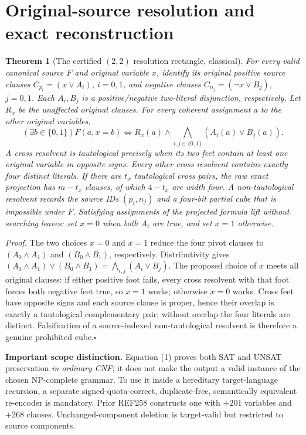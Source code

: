 \documentclass[10pt]{article}
\newtheorem{theorem}{Theorem}
\begin{document}
\section{Original-source resolution and exact reconstruction}
\begin{theorem}[The certified $(2,2)$ resolution rectangle, classical]
For every valid canonical source $F$ and original variable $x$, identify its original positive source clauses $C_{p_i}=(x\vee A_i)$, $i=0,1$, and negative clauses $C_{n_j}=(\neg x\vee B_j)$, $j=0,1$. Each $A_i,B_j$ is a positive/negative two-literal disjunction, respectively. Let $R_x$ be the unaffected original clauses. For every coherent assignment $a$ to the other original variables,
\[
 (\exists b\in\{0,1\})F(a,x=b)
 \iff R_x(a)\land\bigwedge_{i,j\in\{0,1\}}(A_i(a)\vee B_j(a)).\tag{1}
\]
A cross resolvent is tautological precisely when its two feet contain at least one original variable in opposite signs. Every other cross resolvent contains exactly four distinct literals. If there are $t_x$ tautological cross pairs, the raw exact projection has $m-t_x$ clauses, of which $4-t_x$ are width four. A non-tautological resolvent records the source IDs $(p_i,n_j)$ and a four-bit partial cube that is impossible under $F$. Satisfying assignments of the projected formula lift without searching leaves: set $x=0$ when both $A_i$ are true, and set $x=1$ otherwise.
\end{theorem}
\noindent\textit{Proof.} The two choices $x=0$ and $x=1$ reduce the four pivot clauses to $(A_0\land A_1)$ and $(B_0\land B_1)$, respectively. Distributivity gives \((A_0\land A_1)\lor(B_0\land B_1)=\bigwedge_{i,j}(A_i\lor B_j)\). The proposed choice of $x$ meets all original clauses: if either positive foot fails, every cross resolvent with that foot forces both negative feet true, so $x=1$ works; otherwise $x=0$ works. Cross feet have opposite signs and each source clause is proper, hence their overlap is exactly a tautological complementary pair; without overlap the four literals are distinct. Falsification of a source-indexed non-tautological resolvent is therefore a genuine prohibited cube.\hfill$\square$

\noindent\textbf{Important scope distinction.} Equation (1) proves both SAT and UNSAT preservation \emph{in ordinary CNF}; it does not make the output a valid instance of the chosen NP-complete grammar. To use it inside a hereditary target-language recursion, a separate signed-quota-correct, duplicate-free, semantically equivalent re-encoder is mandatory. Prior REF258 constructs one with $+201$ variables and $+268$ clauses. Unchanged-component deletion is target-valid but restricted to source components.
\end{document}
